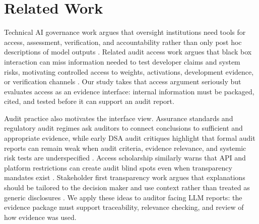 \documentclass{article}
\begin{document}
\section{Related Work}

Technical AI governance work argues that oversight institutions need tools for access, assessment, verification, and accountability rather than only post hoc descriptions of model outputs \citep{reuel2024technical,reuelbucknall2024open,ojewale2025accountability}. Related audit access work argues that black box interaction can miss information needed to test developer claims and system risks, motivating controlled access to weights, activations, development evidence, or verification channels \citep{casper2024blackbox,waiwitlikhit2024trustless,harack2025verification}. Our study takes that access argument seriously but evaluates access as an evidence interface: internal information must be packaged, cited, and tested before it can support an audit report.

Audit practice also motivates the interface view. Assurance standards and regulatory audit regimes ask auditors to connect conclusions to sufficient and appropriate evidence, while early DSA audit critiques highlight that formal audit reports can remain weak when audit criteria, evidence relevance, and systemic risk tests are underspecified \citep{iaasb2013isae3000,solarova2026checkbox,holznagel2025dsa}. Access scholarship similarly warns that API and platform restrictions can create audit blind spots even when transparency mandates exist \citep{burnat2025accountability,cen2024transparency}. Stakeholder first transparency work argues that explanations should be tailored to the decision maker and use context rather than treated as generic disclosures \citep{bell2022stakeholders}. We apply these ideas to auditor facing LLM reports: the evidence package must support traceability, relevance checking, and review of how evidence was used.
\end{document}
